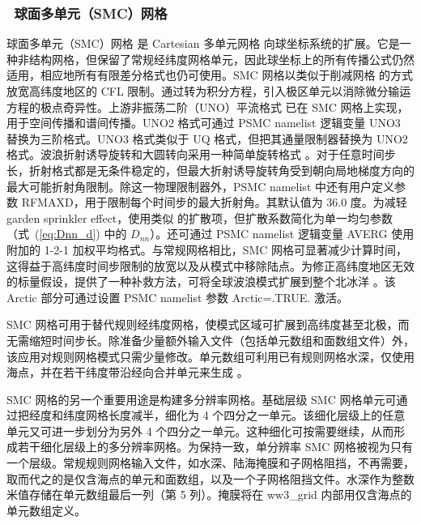 \vssub
\subsubsection{~球面多单元（SMC）网格} \label{sub:num_space_SMC}

\noindent
球面多单元（SMC）网格 \citep{art:Li11} 是 Cartesian 多单元网格 \citep{art:Li03} 向球坐标系统的扩展。它是一种非结构网格，但保留了常规经纬度网格单元，因此球坐标上的所有传播公式仍然适用，相应地所有有限差分格式也仍可使用。SMC 网格以类似于削减网格 \citep{art:RA94} 的方式放宽高纬度地区的 CFL 限制。通过转为积分方程，引入极区单元以消除微分输运方程的极点奇异性。上游非振荡二阶（UNO）平流格式 \citep{art:Li08} 已在 SMC 网格上实现，用于空间传播和谱间传播。UNO2 格式可通过 {\F PSMC} namelist 逻辑变量 {\code UNO3} 替换为三阶格式。UNO3 格式类似于 UQ 格式，但把其通量限制器替换为 UNO2 格式。波浪折射诱导旋转和大圆转向采用一种简单旋转格式 \citep{art:Li12}。对于任意时间步长，折射格式都是无条件稳定的，但最大折射诱导旋转角受到朝向局地梯度方向的最大可能折射角限制。除这一物理限制器外，{\F PSMC} namelist 中还有用户定义参数 {\code RFMAXD}，用于限制每个时间步的最大折射角。其默认值为 36.0 度。为减轻 garden sprinkler effect，使用类似 \cite{art:BH87} 的扩散项，但扩散系数简化为单一均匀参数（式~(\ref{eq:Dnn_d}) 中的 $D_{nn}$）。还可通过 {\F PSMC} namelist 逻辑变量 {\code AVERG} 使用附加的 1-2-1 加权平均格式。与常规网格相比，SMC 网格可显著减少计算时间，这得益于高纬度时间步限制的放宽以及从模式中移除陆点。为修正高纬度地区无效的标量假设，提供了一种补救方法，可将全球波浪模式扩展到整个北冰洋 \citep{art:Li16}。该 Arctic 部分可通过设置 {\F PSMC} namelist 参数 {\code Arctic=.TRUE.} 激活。

SMC 网格可用于替代规则经纬度网格，使模式区域可扩展到高纬度甚至北极，而无需缩短时间步长。除准备少量额外输入文件（包括单元数组和面数组文件）外，该应用对规则网格模式只需少量修改。单元数组可利用已有规则网格水深，仅使用海点，并在若干纬度带沿经向合并单元来生成 \citep{art:Li11}。

SMC 网格的另一个重要用途是构建多分辨率网格。基础层级 SMC 网格单元可通过把经度和纬度网格长度减半，细化为 4 个四分之一单元。该细化层级上的任意单元又可进一步划分为另外 4 个四分之一单元。这种细化可按需要继续，从而形成若干细化层级上的多分辨率网格。为保持一致，单分辨率 SMC 网格被视为只有一个层级。常规规则网格输入文件，如水深、陆海掩膜和子网格阻挡，不再需要，取而代之的是仅含海点的单元和面数组，以及一个子网格阻挡文件。水深作为整数米值存储在单元数组最后一列（第 5 列）。掩膜将在 ww3\_grid 内部用仅含海点的单元数组定义。

